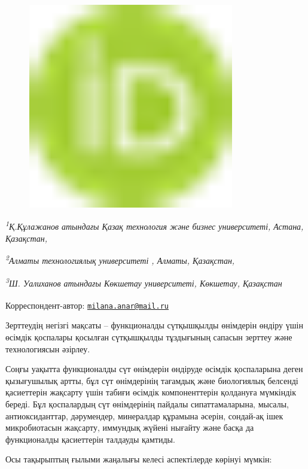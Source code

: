 {\begin{figure}[H]
	\centering
	\includegraphics[width=0.8\textwidth]{media/pish2/image1}
	\caption*{}
\end{figure}


\emph{\textsuperscript{1}Қ.Құлажанов атындағы Қазақ технология және
бизнес университеті, Астана, Қазақстан,}

\emph{\textsuperscript{2}Алматы технологиялық университеті , Алматы,
Қазақстан,}

\emph{\textsuperscript{3}Ш. Уалиханов атындағы Көкшетау университеті,
Көкшетау, Қазақстан}

{\bfseries \textsuperscript{\envelope }}Корреспондент-автор:
\href{mailto:milana.anar@mail.ru}{\nolinkurl{milana.anar@mail.ru}}

Зерттеудің негізгі мақсаты -- функционалды сүтқышқылды өнімдерін өндіру
үшін өсімдік қоспалары қосылған сүтқышқылды тұздығының сапасын зерттеу
және технологиясын әзірлеу.

Соңғы уақытта функционалды сүт өнімдерін өндіруде өсімдік қоспаларына
деген қызығушылық артты, бұл сүт өнімдерінің тағамдық және биологиялық
белсенді қасиеттерін жақсарту үшін табиғи өсімдік компоненттерін
қолдануға мүмкіндік береді. Бұл қоспалардың сүт өнімдерінің пайдалы
сипаттамаларына, мысалы, антиоксиданттар, дәрумендер, минералдар
құрамына әсерін, сондай-ақ ішек микробиотасын жақсарту, иммундық жүйені
нығайту және басқа да функционалды қасиеттерін талдауды қамтиды.

Осы тақырыптың ғылыми жаңалығы келесі аспектілерде көрінуі мүмкін:

}
